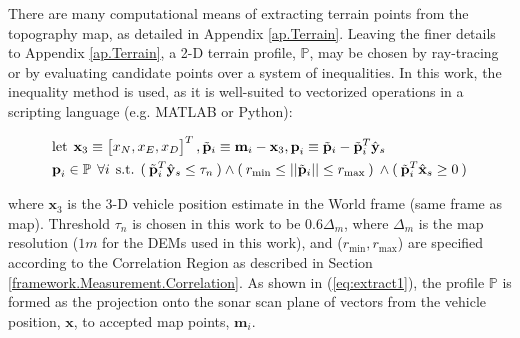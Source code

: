 There are many computational means of extracting terrain points from the topography map, as detailed in Appendix \ref{ap.Terrain}.  
Leaving the finer details to Appendix \ref{ap.Terrain}, a 2-D terrain profile, $\mathbb{P}$, may be chosen by ray-tracing \cite{Glassner1989} or by evaluating candidate points over a system of inequalities.  
In this work, the inequality method is used, as it is well-suited to vectorized operations in a scripting language (e.g. MATLAB or Python):

\begin{align}
\begin{split}
&\text{let} \hspace{1ex} \mathbf{x}_3 \equiv \begin{bmatrix} x_N, x_E, x_D \end{bmatrix}^{T}, \tilde{\mathbf{p}}_i \equiv \mathbf{m}_i - \mathbf{x}_3, \textbf{p}_i \equiv \tilde{\mathbf{p}}_i - \tilde{\mathbf{p}}_i^{T} \hat{\mathbf{y}}_s \\
&\textbf{p}_i \in \mathbb{P} \hspace{1ex} \forall i \hspace{1ex} \text{s.t.} \hspace{1ex} (\hspace{0.5ex} \tilde{\textbf{p}}_i^{T}\hat{\mathbf{y}}_s \leq \tau_n \hspace{0.5ex}) \wedge (\hspace{0.5ex} r_{\text{min}} \leq || \tilde{\mathbf{p}}_i || \leq r_{\text{max}} \hspace{0.5ex}) \hspace{0.5ex} \wedge (\hspace{0.5ex} \tilde{\mathbf{p}}_i^{T}\hat{\mathbf{x}}_s \geq 0 \hspace{0.5ex})
\end{split}
\label{eq:extract1}
\end{align}

\noindent where $\mathbf{x}_3$ is the 3-D vehicle position estimate in the World frame (same frame as map). Threshold $\tau_n$ is chosen in this work to be $0.6\Delta_m$, where $\Delta_m$ is the map resolution ($1m$ for the DEMs used in this work), and ($r_{\text{min}}, r_{\text{max}}$) are specified according to the Correlation Region as described in Section \ref{framework.Measurement.Correlation}.
As shown in (\ref{eq:extract1}), the profile $\mathbb{P}$ is formed as the projection onto the sonar scan plane of vectors from the vehicle position, $\mathbf{x}$, to accepted map points, $\mathbf{m}_i$.
 

